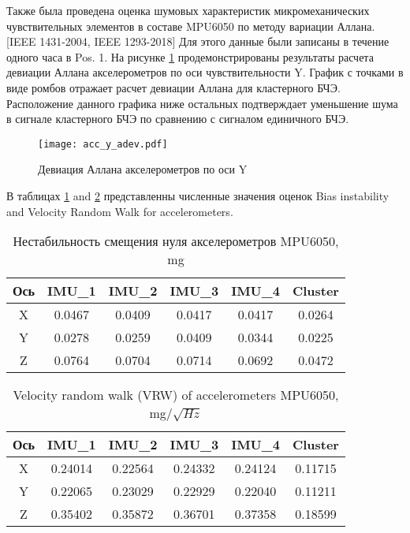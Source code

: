 Также была проведена оценка шумовых характеристик микромеханических чувствительных элементов в составе MPU6050 по методу вариации Аллана. [IEEE 1431-2004, IEEE 1293-2018]
Для этого данные были записаны в течение одного часа в Pos. 1. На рисунке \ref{fig:acc_y_allan} продемонстрированы результаты расчета девиации Аллана акселерометров по оси чувствительности Y.
График с точками в виде ромбов отражает расчет девиации Аллана для кластерного БЧЭ. Расположение данного графика ниже остальных подтверждает уменьшение шума в сигнале кластерного БЧЭ 
по сравнению с сигналом единичного БЧЭ.

\begin{figure}[h!]
	\centering
	\texttt{[image: acc\_y\_adev.pdf]}
	\caption{Девиация Аллана акселерометров по оси Y}
	\label{fig:acc_y_allan}
\end{figure}

\newpage

В таблицах \ref{table:acc_bias} and \ref{table:acc_vrw} представленны численные значения оценок Bias instability and Velocity Random Walk for accelerometers.

\begin{table}[h!]
	\centering
	\begin{tabular}{| c | c | c | c | c | c |}
	\hline
	Ось & IMU\_1 & IMU\_2 & IMU\_3 & IMU\_4 & Cluster \\ \hline
	X & 0.0467 & 0.0409 & 0.0417 & 0.0417 & 0.0264 \\ \hline
	Y & 0.0278 & 0.0259 & 0.0409 & 0.0344 & 0.0225 \\ \hline
	Z & 0.0764 & 0.0704 & 0.0714 & 0.0692 & 0.0472 \\
	\hline
	\end{tabular}
	\caption{Нестабильность смещения нуля акселерометров MPU6050, mg}
	\label{table:acc_bias}
\end{table}

\begin{table}[h!]
	\centering
	\begin{tabular}{| c | c | c | c | c | c |}
	\hline
	Ось & IMU\_1 & IMU\_2 & IMU\_3 & IMU\_4 & Cluster \\ \hline
	X & 0.24014 & 0.22564 & 0.24332 & 0.24124 & 0.11715 \\ \hline
	Y & 0.22065 & 0.23029 & 0.22929 & 0.22040 & 0.11211 \\ \hline
	Z & 0.35402 & 0.35872 & 0.36701 & 0.37358 & 0.18599 \\
	\hline
	\end{tabular}
	\caption{Velocity random walk (VRW) of accelerometers MPU6050, mg/$\sqrt{Hz}$}
	\label{table:acc_vrw}
\end{table}

